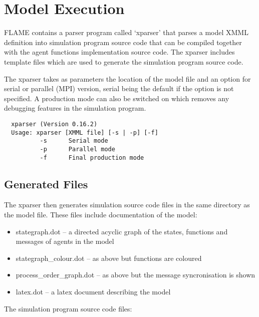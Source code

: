 \section{Model Execution}
\label{sec:model_execution}

FLAME contains a parser program called `xparser' that parses a model
XMML definition into simulation program source code that can be compiled
together with the agent functions implementation source code. The xparser
includes template files which are used to generate the simulation program source code.

The xparser takes as parameters the location of the model file and an option
for serial or parallel (MPI) version, serial being the default if the option is
not specified. A production mode can also be switched on which removes any
debugging features in the simulation program.

\begin{verbatim}
  xparser (Version 0.16.2)
  Usage: xparser [XMML file] [-s | -p] [-f]
          -s      Serial mode
          -p      Parallel mode
          -f      Final production mode
\end{verbatim}

\subsection{Generated Files}

The xparser then generates simulation source code files in the same directory
as the model file. These files include documentation of the model:

\begin{itemize}
  \item stategraph.dot -- a directed acyclic graph of the states, functions and
  messages of agents in the model
  \item stategraph\_colour.dot -- as above but functions are coloured
  \item process\_order\_graph.dot -- as above but the message syncronisation is
  shown
  \item latex.dot -- a latex document describing the model
\end{itemize}

The simulation program source code files:


